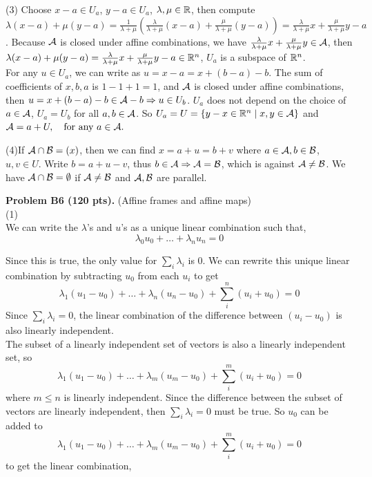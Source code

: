 \documentclass[12pt]{article}
\begin{document}
\medskip
(3)
Choose $x - a \in U_a$, $y - a \in U_a$, $\lambda, \mu \in \mathbb{R}$, then compute $\lambda (x - a) + \mu (y - a) = \frac{1}{\lambda + \mu}(\frac{\lambda}{\lambda + \mu}(x - a) + \frac{\mu}{\lambda + \mu}(y - a)) = \frac{\lambda}{\lambda + \mu} x + \frac{\mu}{\lambda + \mu} y - a$. Because ${\cal A}$ is closed under affine combinations, we have $\frac{\lambda}{\lambda + \mu} x + \frac{\mu}{\lambda + \mu} y \in {\cal A}$, then $\lambda (x - a) + \mu (y - a) = \frac{\lambda}{\lambda + \mu} x + \frac{\mu}{\lambda + \mu} y - a \in \mathbb{R}^n$, $U_a$ is a subspace of $\mathbb{R}^n$.\\
For any $u \in U_a$, we can write as $u = x - a = x + (b - a) - b$. The sum of coefficients of $x, b, a$ is $1 -1 + 1 = 1$, and ${\cal A}$ is closed under affine combinations, then $u = x + (b -a)-b \in {\cal A} - b \Rightarrow u \in U_b$. $U_a$ does not depend on the choice of $a \in {\cal A}$, $U_a = U_b$ for all $a, b\in {\cal A}$.
So $U_a = U = \{y - x \in \mathbb{R}^n \mid x, y \in {\cal A}\}$ and
$
{\cal A} = a + U, \quad\hbox{for any $a\in {\cal A}$}.
$

\medskip
(4)If ${\cal A}\cap {\cal B} = (x)$, then we can find $x = a + u = b + v$ where $a \in {\cal A}, b \in {\cal B}$, $u, v \in U$. Write $b = a + u - v$, thus $b \in {\cal A} \Rightarrow {\cal A} = {\cal B}$, which is against ${\cal A} \neq {\cal B}$. We have ${\cal A} \cap {\cal B} = \emptyset$ if ${\cal A} \neq {\cal B}$ and ${\cal A}, {\cal B}$ are parallel. 

\vspace {0.25cm}\noindent
{\bf Problem B6 (120 pts).} (Affine frames and affine maps) \\
(1) \\

We can write the $\lambda$'s and $u$'s as a unique linear combination such that, 
$$ \lambda_0 u_0 + \ldots + \lambda_n u_n = 0 $$

Since this is true, the only value for $\sum_{i} \lambda_i$ is 0. We can rewrite this unique linear combination by subtracting $u_0$ from each $u_i$ to get $$\lambda_1 (u_1 - u_0) + \ldots + \lambda_n (u_n - u_0) + \sum_{i}^{n} (u_i + u_0) = 0$$ Since $\sum_{i} \lambda_i = 0$, the linear combination of the difference between $(u_i - u_0)$ is also linearly independent. \\

The subset of a linearly independent set of vectors is also a linearly independent set, so $$\lambda_1 (u_1 - u_0) + \ldots + \lambda_m (u_m - u_0) + \sum_{i}^{m} (u_i + u_0) = 0$$ where $m \leq n$ is linearly independent. Since the difference between the subset of vectors are linearly independent, then $\sum_{i} \lambda_i = 0$ must be true. So $u_0$ can be added to $$\lambda_1 (u_1 - u_0) + \ldots + \lambda_m (u_m - u_0) + \sum_{i}^{m} (u_i + u_0) = 0$$ to get the linear combination, 
\end{document}
